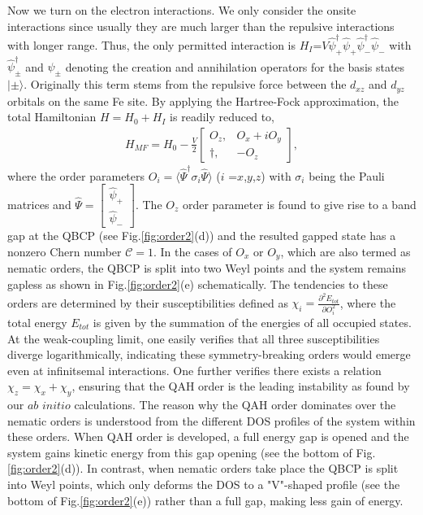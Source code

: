 \documentclass[twocolumn,english,prb,showpacs]{revtex4-1}
\begin{document}
Now we turn on the electron interactions. We only consider the onsite interactions since usually they are much larger than the repulsive interactions with longer range. Thus, the only permitted interaction is $H_{I}$=$V\hat{\psi}_{+}^\dag\hat{\psi}_{+}\hat{\psi}_{-}^\dag\hat{\psi}_{-}$ with $ \hat{\psi}^\dag_{\pm}$ and $\hat{\psi}_{\pm}$ denoting the creation and annihilation operators for the basis states $|\pm\rangle$. Originally this term stems from the repulsive force between the $d_{xz}$ and $d_{yz}$ orbitals on the same Fe site. By applying the Hartree-Fock approximation, the total Hamiltonian $H=H_0+H_I$ is readily reduced to,
\begin{eqnarray}
  H_{MF}=H_0-\frac{V}{2}\left[\begin{array}{cc}
               O_{z}, & O_x+i O_y\\
                \dag, & -O_{z}
              \end{array}\right],
              \label{eq:mf_model}
\end{eqnarray}
where the order parameters $O_i=\langle\hat{\Psi}^{\dag}\sigma_i\hat{\Psi}\rangle$ ($i$ =$x$,$y$,$z$) with $\sigma_i$ being the Pauli matrices and $\hat{\Psi}=\left[\begin{array}{c}\hat{\psi}_{+}\\\hat{\psi}_{-}\end{array}\right]$.
The $O_z$ order parameter is found to give rise to a band gap at the QBCP (see Fig.\ref{fig:order2}(d)) and the resulted gapped state has a nonzero Chern number $\mathcal{C}=1$. In the cases of $O_x$ or $O_y$, which are also termed as nematic orders, the QBCP is split into two Weyl points and the system remains gapless as shown in Fig.\ref{fig:order2}(e) schematically. The tendencies to these orders are determined by their susceptibilities defined as $\chi_i=\frac{\partial^2 E_{tot}}{\partial O_i^2}$, where the total energy $E_{tot}$ is given by the summation of the energies of all occupied states. At the weak-coupling limit, one easily verifies that all three susceptibilities diverge logarithmically, indicating these symmetry-breaking orders would emerge even at infinitsemal interactions. One further verifies there exists a relation $\chi_z=\chi_x+\chi_y$, ensuring that the QAH order is the leading instability as found by our $\textit{ab initio}$ calculations. The reason why the QAH order dominates over the nematic orders is understood from the different DOS profiles of the system within these orders. When QAH order is developed, a full energy gap is opened and the system gains kinetic energy from this gap opening (see the bottom of Fig.\ref{fig:order2}(d)). In contrast, when nematic orders take place the QBCP is split into Weyl points, which only deforms the DOS to a "V"-shaped profile (see the bottom of Fig.\ref{fig:order2}(e)) rather than a full gap, making less gain of energy.
\end{document}
